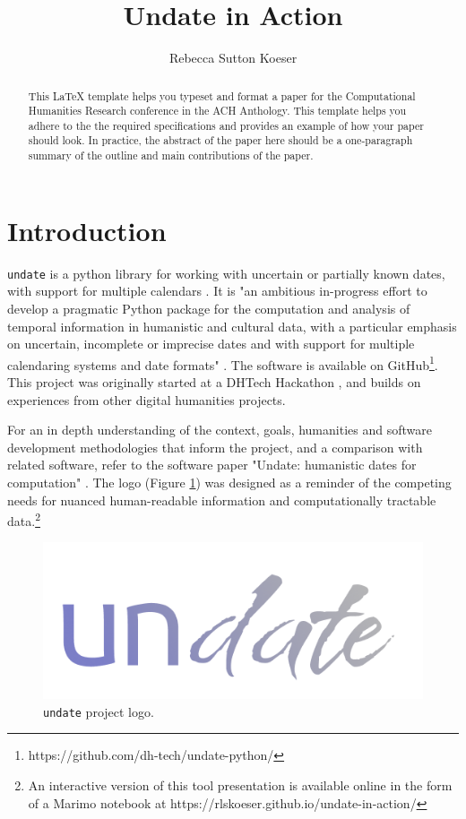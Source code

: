 \documentclass{anthology-ch}         %
\title{Undate in Action}
\author[1]{Rebecca Sutton Koeser}[
  orcid=0000-0002-8762-8057
]
\affiliation{1}{Center for Digital Humanities, Princeton University, Princeton, New Jersey, USA}
\begin{document}
\maketitle

\begin{abstract}
This LaTeX template helps you typeset and format a paper for the Computational Humanities Research conference in the ACH Anthology. This template helps you adhere to the the required specifications and provides an example of how your paper should look. In practice, the abstract of the paper here should be a one-paragraph summary of the outline and main contributions of the paper. 
\end{abstract}

\section{Introduction} 


\texttt{undate} is a python library for working with uncertain or partially known dates, with support for multiple calendars \cite{koeser_undate_2025}. It is "an ambitious in-progress effort to develop a pragmatic Python package for the computation and analysis of temporal information in humanistic and cultural data, with a particular emphasis on uncertain, incomplete or imprecise dates and with support for multiple calendaring systems and date formats" \cite{koeser_princeton_2025}. The software is available on GitHub\footnote{https://github.com/dh-tech/undate-python/}. This project was originally started at a DHTech Hackathon \cite{koeser_join_2023}, and builds on experiences from other digital humanities projects.

For an in depth understanding of the context, goals, humanities and software development methodologies that inform the project, and a comparison with related software, refer to the software paper "Undate: humanistic dates for computation" \cite{koeser_princeton_2025}.  The logo (Figure \ref{fig:logo}) was designed as a reminder of the competing needs for nuanced human-readable information and computationally tractable data.\footnote{An interactive version of this tool presentation is available online in the form of a Marimo notebook at https://rlskoeser.github.io/undate-in-action/}

\begin{figure}[h]
  \centering
  \includegraphics[width=0.4\linewidth]{assets/undate_logo.png}
  \caption{\texttt{undate} project logo.}
  \label{fig:logo}
\end{figure}
\end{document}
